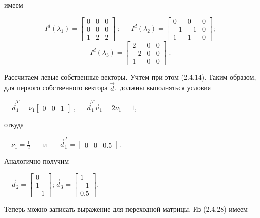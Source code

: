 		имеем


\begin{equation*}
I^d(\lambda _1)=\left[\begin{matrix}0&0&0\\0&0&0\\1&2&2\end{matrix}\right]\;;\;\;\;\;\;I^d(\lambda _2)=\left[\begin{matrix}0&0&0\\-1&-1&0\\1&1&0\end{matrix}\right];
\end{equation*}
\begin{equation*}
I^d(\lambda _3)=\left[\begin{matrix}2&0&0\\-2&0&0\\1&0&0\end{matrix}\right]\;.
\end{equation*}

		Рассчитаем левые собственные векторы. Учтем при этом (2.4.14). Таким образом, для первого собственного вектора  $\vec
		d_1$ должны выполняться условия



		\ \  $\vec d_1^T=ν_1\left[\begin{matrix}0&0&1\end{matrix}\right]\;,\;\;\;\;\;\vec d_1^T\vec v_1=2ν_1=1$,



		откуда 



		\ \  $ν_1=\frac 1 2$ \ \ \ и \ \ \  $\vec d_1^T=\left[\begin{matrix}0&0&0.5\end{matrix}\right]$.



		Аналогично получим



		\ \  $\vec d_2=\left[\begin{matrix}0\\1\\-1\end{matrix}\right];_{}^{}\vec
		d_3=\left[\begin{matrix}1\\-1\\0.5\end{matrix}\right]$.



		Теперь можно записать выражение для переходной матрицы. Из (2.4.28) имеем


